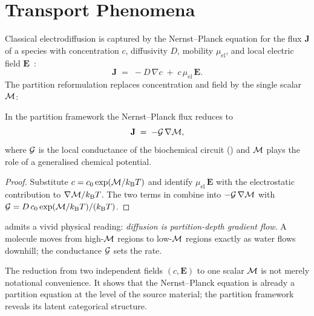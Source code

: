 \section{Transport Phenomena}
\label{sec:transport}

Classical electrodiffusion is captured by the Nernst--Planck equation for the
flux $\mathbf{J}$ of a species with concentration $c$, diffusivity $D$, mobility
$\mu_\mathrm{el}$, and local electric field $\mathbf{E}$~\citep{Nelson2004}:
\begin{equation}
    \mathbf{J}
    \;=\;
    -D\,\nabla c \;+\; c\,\mu_\mathrm{el}\,\mathbf{E}.
    \label{eq:nernst-planck}
\end{equation}
The partition reformulation replaces concentration and field by the single
scalar $\mathcal{M}$:

\begin{theorem}
\label{thm:partition-flux}
In the partition framework the Nernst--Planck flux reduces to
\begin{equation}
    \mathbf{J}
    \;=\;
    -\mathcal{G}\,\nabla\mathcal{M},
    \label{eq:partition-flux}
\end{equation}
where $\mathcal{G}$ is the local conductance of the biochemical circuit
() and $\mathcal{M}$ plays the role of a generalised
chemical potential.
\end{theorem}

\begin{proof}
Substitute $c = c_0\exp(\mathcal{M}/k_{\mathrm{B}} T)$ and identify $\mu_\mathrm{el}\,\mathbf{E}$
with the electrostatic contribution to $\nabla\mathcal{M}/k_{\mathrm{B}} T$.  The two terms
in  combine into $-\mathcal{G}\,\nabla\mathcal{M}$ with
$\mathcal{G} = D\,c_0\exp(\mathcal{M}/k_{\mathrm{B}} T)/(k_{\mathrm{B}} T)$.
\end{proof}

 admits a vivid physical reading: \emph{diffusion is
partition-depth gradient flow}.  A molecule moves from high-$\mathcal{M}$ regions to
low-$\mathcal{M}$ regions exactly as water flows downhill; the conductance $\mathcal{G}$
sets the rate.

\begin{remark}
The reduction from two independent fields $(c,\mathbf{E})$ to one scalar $\mathcal{M}$
is not merely notational convenience.  It shows that the Nernst--Planck equation
is already a partition equation at the level of the source material; the
partition framework reveals its latent categorical structure.
\end{remark}

